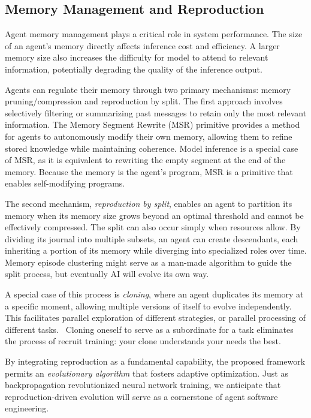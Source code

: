 \subsection{Memory Management and Reproduction}

Agent memory management plays a critical role in system performance. The size of an agent’s memory directly affects inference cost and efficiency. A larger memory size also increases the difficulty for model to attend to relevant information, potentially degrading the quality of the inference output.

Agents can regulate their memory through two primary mechanisms: memory pruning/compression and reproduction by split. The first approach involves selectively filtering or summarizing past messages to retain only the most relevant information. The Memory Segment Rewrite (MSR) primitive provides a method for agents to autonomously modify their own memory, allowing them to refine stored knowledge while maintaining coherence.  Model inference is a special case of MSR, as it is equivalent to rewriting the empty segment at the end of the memory. Because the memory is the agent's program, MSR is a primitive that enables self-modifying programs.

The second mechanism, \emph{reproduction by split}, enables an agent to partition its memory when its memory size grows beyond an optimal threshold and cannot be effectively compressed.  The split can also occur simply when resources allow. By dividing its journal into multiple subsets, an agent can create descendants, each inheriting a portion of its memory while diverging into specialized roles over time. Memory episode clustering might serve as a man-made algorithm to guide the split process, but eventually AI will evolve its own way.

A special case of this process is \emph{cloning}, where an agent duplicates its memory at a specific moment, allowing multiple versions of itself to evolve independently. This facilitates parallel exploration of different strategies, or parallel processing of different tasks.  Cloning oneself to serve as a subordinate for a task eliminates the process of recruit training: your clone understands your needs the best.

By integrating reproduction as a fundamental capability, the proposed framework permits an \emph{evolutionary algorithm} that fosters adaptive optimization. Just as backpropagation revolutionized neural network training, we anticipate that reproduction-driven evolution will serve as a cornerstone of agent software engineering.

